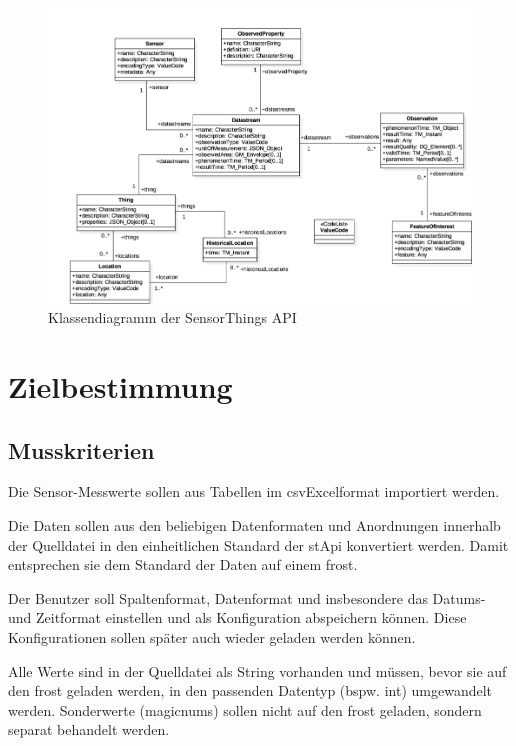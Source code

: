 \documentclass[a4paper, 12 pt]{article}
\begin{document}
\begin{figure}
\centering
\includegraphics[scale=0.9]{images/ogc}
\caption{\label{fig:ogc}Klassendiagramm der SensorThings API}
\end{figure}

\pagebreak
\section{Zielbestimmung}
	\subsection{Musskriterien}
	
	
	Die Sensor-Messwerte sollen aus Tabellen im \gls{csvExcel}format importiert werden.

	Die Daten sollen aus den beliebigen Datenformaten und Anordnungen innerhalb der Quelldatei in den einheitlichen Standard der \gls{stApi} konvertiert werden.
    Damit entsprechen sie dem Standard der Daten auf einem \gls{frost}.
	
	Der Benutzer soll Spaltenformat, Datenformat und insbesondere das Datums- und Zeitformat einstellen und als Konfiguration abspeichern können.
    Diese Konfigurationen sollen später auch wieder geladen werden können.

	Alle Werte sind in der Quelldatei als String vorhanden und müssen, bevor sie auf den \gls{frost} geladen werden, in den passenden Datentyp (bspw. \gls{int}) umgewandelt werden.
	Sonderwerte (\glspl{magicnum}) sollen nicht auf den \gls{frost} geladen, sondern separat behandelt werden.	
	
\end{document}
